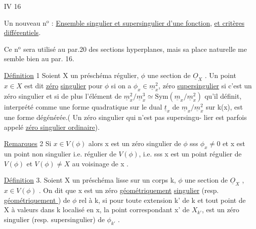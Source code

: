 
IV 16

Un nouveau n$^{\text{o}}$ : \uline{Ensemble singulier et supersingulier d'une fonction},
\uline{et critères différentiels}.

Ce n$^{\text{o}}$ sera utilisé au par.20 des sections hyperplanes, mais sa
place naturelle me semble bien au par. 16.

\uline{Définition} 1 Soient X un préschéma régulier, $\phi$ une section de $\underline{O}_X$ . Un
point $x \in X$ est dit \uline{zéro}  \uline{singulier} pour $\phi$
si on a $\phi_x \in \underline{m}_x^2$, zéro \uline{supersingulier} si c'est un zéro singulier
et si de plus l'élément de $\underline{m}_x^2/\underline{m}_x^3 \simeq \mathrm{Sym}(\underline{m}_x/\underline{m}_x^2)$ qu'il définit,
interprété comme une forme quadratique sur le dual $\underline{t}_x$ de $\underline{m}_x/\underline{m}_x^2$ sur k(x),
est une forme  dégénérée.( Un zéro singulier qui n'est pas supersingu-%
lier est parfois appelé \uline{zéro singulier ordinaire}).

\uline{Remarques} 2 Si $x \in V(\phi)$\hand{,} alors x est un zéro  singulier de $\phi$ sss
$\phi_x \neq 0$ et x est un point  non singulier i.e. régulier de $V(\phi)$,
i.e. sss x est un point régulier de $V(\phi)$ et $V(\phi) \neq X$ au voisinage de
x . 

\uline{Définition} 3. Soient X un préschéma lisse sur un corps k, $\phi$ une
section de $\underline{O}_X$ , $x \in V(\phi)$ . On dit que x est un zéro \uline{géométriquement}
\uline{singulier}  (resp. \uline{géométriquement } ) de $\phi$ rel à k,
si pour toute extension k' de k et tout point \hand{$\xi$} de X à valeurs dans
k\hand{,} localisé en x, la  point correspondant x' de $X_{k'}$, est un zéro
 singulier (resp. supersingulier) de $\phi_{k'}$ .

